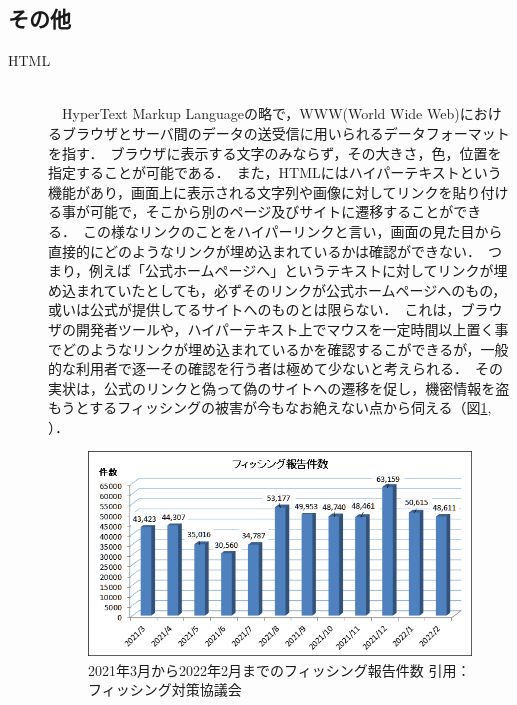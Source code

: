 \documentclass[dvipdfmx]{jsarticle}
\begin{document}
        \subsection{その他}
            \begin{description}
                \item[HTML]\mbox{}\\
                    　HyperText Markup Languageの略で，WWW(World Wide Web)におけるブラウザとサーバ間のデータの送受信に用いられるデータフォーマットを指す．\
                    ブラウザに表示する文字のみならず，その大きさ，色，位置を指定することが可能である．\
                    また，HTMLにはハイパーテキストという機能があり，画面上に表示される文字列や画像に対してリンクを貼り付ける事が可能で，そこから別のページ及びサイトに遷移することができる\cite{AboutHTML}．\
                    この様なリンクのことをハイパーリンクと言い，画面の見た目から直接的にどのようなリンクが埋め込まれているかは確認ができない．\
                    つまり，例えば「公式ホームページへ」というテキストに対してリンクが埋め込まれていたとしても，必ずそのリンクが公式ホームページへのもの，或いは公式が提供してるサイトへのものとは限らない．\
                    これは，ブラウザの開発者ツールや，ハイパーテキスト上でマウスを一定時間以上置く事でどのようなリンクが埋め込まれているかを確認するこができるが，一般的な利用者で逐一その確認を行う者は極めて少ないと考えられる．\
                    その実状は，公式のリンクと偽って偽のサイトへの遷移を促し，機密情報を盗もうとするフィッシングの被害が今もなお絶えない点から伺える（図\ref{fishing}, \cite{Fishing}）．\
                    \begin{figure}[h]
                        \centering
                        \includegraphics[width=12cm]{img/fishing.png}
                        \caption{2021年3月から2022年2月までのフィッシング報告件数 引用：フィッシング対策協議会}
                        \label{fishing}
                    \end{figure}
            \end{description}
            \clearpage
\end{document}
